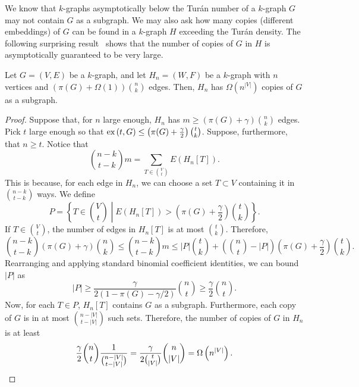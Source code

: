 We know that $k$-graphs asymptotically below the Turán number of a $k$-graph $G$
may not contain $G$ as a subgraph.
We may also ask how many copies (different embeddings) of $G$ can be found in a $k$-graph $H$
exceeding the Turán density.
The following surprising result~\cite{erdHos1983supersaturated} shows that the number of copies of $G$ in $H$
is asymptotically guaranteed to be very large.

\begin{theorem} \label{thm:supersaturation}
    Let $G = (V, E)$ be a $k$-graph, and let $H_n = (W, F)$ be a $k$-graph with $n$ vertices
    and $\left(\pi(G) + \Omega(1) \right) \binom{n}{k}$ edges. %
    Then, $H_n$ has $\Omega \left(n^{|V|} \right)$ copies of $G$ as a subgraph.
    \begin{proof}
        Suppose that, for $n$ large enough, $H_n$ has $ m \geq (\pi(G) + \gamma) \binom{n}{k}$ edges.
        Pick $t$ large enough so that $\text{ex} \left( t, G \right) \leq \left(\pi(G) + \frac{\gamma}{2}\right) \binom{t}{k}$.
        Suppose, furthermore, that $n \geq t$.
        Notice that
        \[
            \binom{n-k}{t-k}m = \sum_{T \in \binom{V}{t}} E(H_n[T]).
        \]
        This is because, for each edge in $H_n$, we can choose a set $T \subset V$ containing it in
        $\binom{n-k}{t-k}$ ways.
        We define
        \[
            P = \left\{ T \in \binom{V}{t} \middle| E(H_n[T]) > \left(\pi(G) + \frac{\gamma}{2}\right) \binom{t}{k} \right\}.
        \]
        If $T \in \binom{V}{t}$, the number of edges in $H_n[T]$ is at most $\binom{t}{k}$.
        Therefore,
        \[
            \binom{n-k}{t-k}(\pi(G) + \gamma)\binom{n}{k}
            \leq \binom{n-k}{t-k}m
            \leq |P| \binom{t}{k} + \left(\binom{n}{t} - |P|\right) \left(\pi(G) + \frac{\gamma}{2}\right) \binom{t}{k}.
        \]
        Rearranging and applying standard binomial coefficient identities, we can bound $|P|$ as
        \[
            |P| \geq \frac{\gamma}{2(1 - \pi(G)- \gamma /2)} \binom{n}{t} \geq \frac{\gamma}{2} \binom{n}{t}.
        \]
        Now, for each $T \in P$, $H_n[T]$ contains $G$ as a subgraph.
        Furthermore, each copy of $G$ is in at most $\binom{n - |V|}{t - |V|}$
        such sets.
        Therefore, the number of copies of $G$ in $H_n$ is at least
        \[
            \frac{\gamma}{2} \binom{n}{t} \frac{1}{\binom{n - |V|}{t - |V|}}
            = \frac{\gamma}{2 \binom{t}{|V|}} \binom{n}{|V|}
            = \Omega\left( n^{|V|}\right). \qedhere
        \]
    \end{proof}
\end{theorem}

